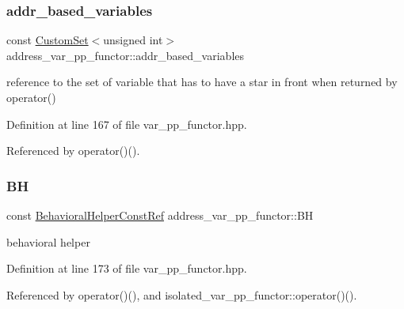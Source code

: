 \subsubsection{\texorpdfstring{addr\+\_\+based\+\_\+variables}{addr\_based\_variables}}
{\footnotesize\ttfamily const \hyperlink{custom__set_8hpp_a615bc2f42fc38a4bb1790d12c759e86f}{Custom\+Set}$<$unsigned int$>$ address\+\_\+var\+\_\+pp\+\_\+functor\+::addr\+\_\+based\+\_\+variables\hspace{0.3cm}{\ttfamily [private]}}



reference to the set of variable that has to have a star in front when returned by operator() 



Definition at line 167 of file var\+\_\+pp\+\_\+functor.\+hpp.



Referenced by operator()().

\mbox{\label{structaddress__var__pp__functor_aa7335df50eb216fe15b1f9100b2e353d}} 
\subsubsection{\texorpdfstring{BH}{BH}}
{\footnotesize\ttfamily const \hyperlink{behavioral__helper_8hpp_aae973b54cac87eef3b27442aa3e1e425}{Behavioral\+Helper\+Const\+Ref} address\+\_\+var\+\_\+pp\+\_\+functor\+::\+BH\hspace{0.3cm}{\ttfamily [private]}}



behavioral helper 



Definition at line 173 of file var\+\_\+pp\+\_\+functor.\+hpp.



Referenced by operator()(), and isolated\+\_\+var\+\_\+pp\+\_\+functor\+::operator()().

\mbox{\label{structaddress__var__pp__functor_a4805a40dad12be1acf296023dd44f1c7}} 
